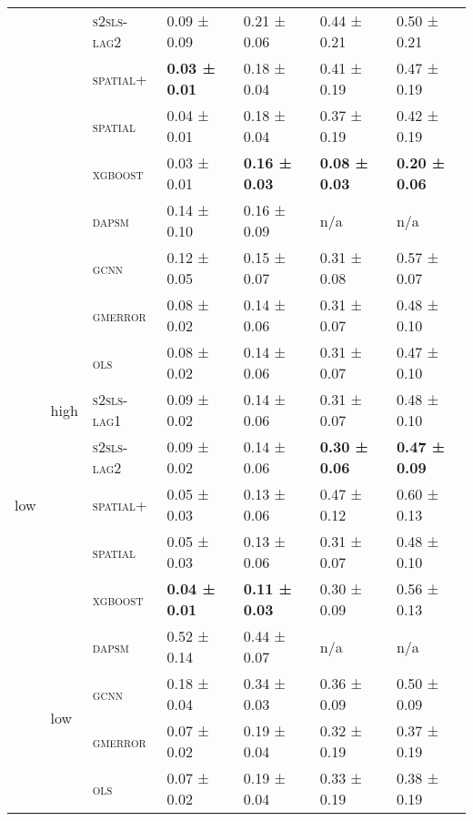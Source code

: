 \documentclass{article}
\begin{document}
\begin{table}[!tbp]
\begin{tabular}{lllllll}
 &  & \textsc{s2sls-lag2} & 0.09 ± {\small 0.09} & 0.21 ± {\small 0.06} & 0.44 ± {\small 0.21} & 0.50 ± {\small 0.21} \\
 &  & \textsc{spatial+} & \bf 0.03 ± {\small 0.01} & 0.18 ± {\small 0.04} & 0.41 ± {\small 0.19} & 0.47 ± {\small 0.19} \\
 &  & \textsc{spatial} & 0.04 ± {\small 0.01} & 0.18 ± {\small 0.04} & 0.37 ± {\small 0.19} & 0.42 ± {\small 0.19} \\
 &  & \textsc{xgboost} & 0.03 ± {\small 0.01} & \bf 0.16 ± {\small 0.03} & \bf 0.08 ± {\small 0.03} & \bf 0.20 ± {\small 0.06} \\
\cline{1-7} \cline{2-7}
\multirow[t]{18}{*}{low} & \multirow[t]{9}{*}{high} & \textsc{dapsm} & 0.14 ± {\small 0.10} & 0.16 ± {\small 0.09} & n/a & n/a \\
 &  & \textsc{gcnn} & 0.12 ± {\small 0.05} & 0.15 ± {\small 0.07} & 0.31 ± {\small 0.08} & 0.57 ± {\small 0.07} \\
 &  & \textsc{gmerror} & 0.08 ± {\small 0.02} & 0.14 ± {\small 0.06} & 0.31 ± {\small 0.07} & 0.48 ± {\small 0.10} \\
 &  & \textsc{ols} & 0.08 ± {\small 0.02} & 0.14 ± {\small 0.06} & 0.31 ± {\small 0.07} & 0.47 ± {\small 0.10} \\
 &  & \textsc{s2sls-lag1} & 0.09 ± {\small 0.02} & 0.14 ± {\small 0.06} & 0.31 ± {\small 0.07} & 0.48 ± {\small 0.10} \\
 &  & \textsc{s2sls-lag2} & 0.09 ± {\small 0.02} & 0.14 ± {\small 0.06} & \bf 0.30 ± {\small 0.06} & \bf 0.47 ± {\small 0.09} \\
 &  & \textsc{spatial+} & 0.05 ± {\small 0.03} & 0.13 ± {\small 0.06} & 0.47 ± {\small 0.12} & 0.60 ± {\small 0.13} \\
 &  & \textsc{spatial} & 0.05 ± {\small 0.03} & 0.13 ± {\small 0.06} & 0.31 ± {\small 0.07} & 0.48 ± {\small 0.10} \\
 &  & \textsc{xgboost} & \bf 0.04 ± {\small 0.01} & \bf 0.11 ± {\small 0.03} & 0.30 ± {\small 0.09} & 0.56 ± {\small 0.13} \\
\cline{2-7}
 & \multirow[t]{9}{*}{low} & \textsc{dapsm} & 0.52 ± {\small 0.14} & 0.44 ± {\small 0.07} & n/a & n/a \\
 &  & \textsc{gcnn} & 0.18 ± {\small 0.04} & 0.34 ± {\small 0.03} & 0.36 ± {\small 0.09} & 0.50 ± {\small 0.09} \\
 &  & \textsc{gmerror} & 0.07 ± {\small 0.02} & 0.19 ± {\small 0.04} & 0.32 ± {\small 0.19} & 0.37 ± {\small 0.19} \\
 &  & \textsc{ols} & 0.07 ± {\small 0.02} & 0.19 ± {\small 0.04} & 0.33 ± {\small 0.19} & 0.38 ± {\small 0.19} \\

\end{tabular}
\end{table}
\end{document}
